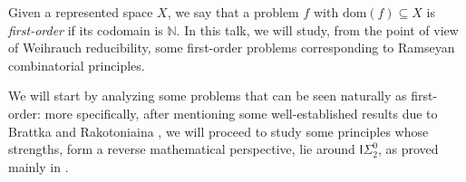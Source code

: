 \documentclass[bsl,meeting]{asl}
\newcommand{\isig}[1]{\mathsf{I}\Sigma^0_{#1}}
\newcommand{\NP}{}
\begin{document}
\thispagestyle{empty}


\NP  
{}






Given a represented space $X$, we say that a problem $f$ with $\mathrm{dom}(f)\subseteq X$ is \emph{first-order} if its codomain is $\mathbb{N}$. In this talk, we will study, from the point of view of Weihrauch reducibility, some first-order problems corresponding to Ramseyan combinatorial principles.

We will start by analyzing some problems that can be seen naturally as first-order: more specifically, after mentioning some well-established results due to Brattka and Rakotoniaina \cite{brattka-rakotoniaina}, we will proceed to study some principles whose strengths, form a reverse mathematical perspective, lie around $\isig 2$, as proved mainly in \cite{pradic-et-al}.
\end{document}
